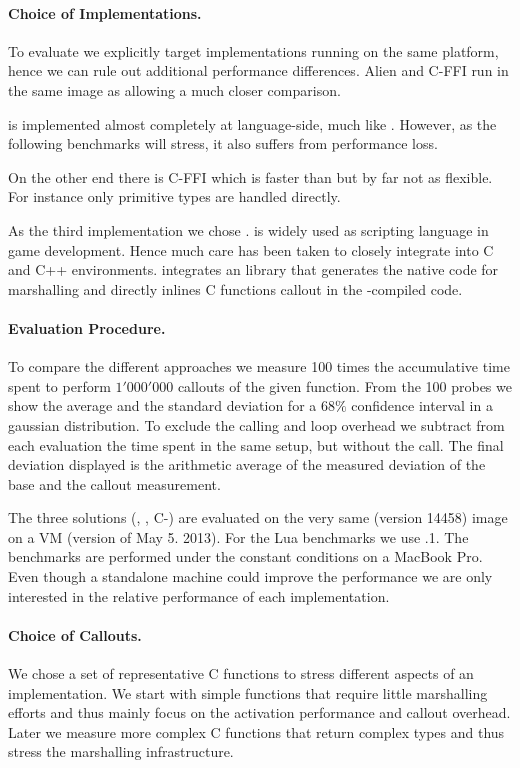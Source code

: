 \paragraph{Choice of \FFI Implementations.}
To evaluate \NB we explicitly target \FFI implementations running on the same platform, hence we can rule out additional performance differences.
Alien and C-FFI run in the same \PH image as \NB allowing a much closer comparison.

\Alien \FFI is implemented almost completely at language-side, much like \NB.
However, as the following benchmarks will stress, it also suffers from performance loss.

On the other end there is C-FFI which is faster than \Alien but by far not as flexible.
For instance only primitive types are handled directly.

As the third implementation we chose \Lua.
\Lua is widely used as scripting language in game development.
Hence much care has been taken to closely integrate \Lua into C and C++ environments.
\LuaJIT integrates an \FFI library that generates the native code for marshalling and directly inlines C functions callout in the \JIT-compiled code.

\paragraph{Evaluation Procedure.}
To compare the different \FFI approaches we measure 100 times the accumulative time spent to perform $1'000'000$ callouts of the given function.
From the 100 probes we show the average and the standard deviation for a $68\%$ confidence interval in a gaussian distribution.
To exclude the calling and loop overhead we subtract from each evaluation the time spent in the same setup, but without the \FFI call.
The final deviation displayed is the arithmetic average of the measured deviation of the base and the callout measurement.

The three \ST \FFI solutions (\NB, \Alien, C-\FFI) are evaluated on the very same  (version 14458) image on a \PH VM (version of May 5. 2013).
For the Lua benchmarks we use .1.
The benchmarks are performed under the constant conditions on a MacBook Pro.
Even though a standalone machine could improve the performance we are only interested in the relative performance of each implementation.


\paragraph{Choice of Callouts.}
We chose a set of representative C functions to stress different aspects of an \FFI implementation.
We start with simple functions that require little marshalling efforts and thus mainly focus on the activation performance and callout overhead.
Later we measure more complex C functions that return complex types and thus stress the marshalling infrastructure.

